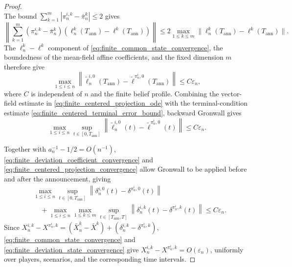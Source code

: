 \documentclass[12pt]{article}
\numberwithin{equation}{section}
\theoremstyle{definition}
\begin{document}
\begin{proof}
\begin{equation}
\end{equation}
The bound
\(\sum_{k=1}^m|\pi_n^{i,k}-\bar\pi_n^k|\leq2\) gives
\[
\left\|
\sum_{k=1}^m
(\pi_n^{i,k}-\bar\pi_n^k)
(\ell_n^k(T_{\mathrm{ann}})-\ell^k(T_{\mathrm{ann}}))
\right\|
\leq
2\max_{1\leq k\leq m}
\|\ell_n^k(T_{\mathrm{ann}})-\ell^k(T_{\mathrm{ann}})\|.
\]
The \(\ell_n^k-\ell^k\) component of
\eqref{eq:finite_common_state_convergence}, the boundedness of the
mean-field affine coefficients, and the fixed dimension \(m\) therefore
give
\begin{equation}\label{eq:finite_centered_terminal_error_bound}
\max_{1\leq i\leq n}
\left\|
\widetilde\ell_n^{i,0}(T_{\mathrm{ann}})
-\widetilde\ell^{\pi_n^i,0}(T_{\mathrm{ann}})
\right\|
\leq
C\varepsilon_n,
\end{equation}
where \(C\) is independent of \(n\) and the finite belief profile.
Combining the vector-field estimate in
\eqref{eq:finite_centered_projection_ode} with the terminal-condition
estimate \eqref{eq:finite_centered_terminal_error_bound}, backward Gronwall
gives
\begin{equation}\label{eq:finite_centered_projection_convergence}
\max_{1\le i\le n}
\sup_{t\in[0,T_{\mathrm{ann}}]}
\left\|
\widetilde\ell_n^{i,0}(t)-\widetilde\ell^{\pi_n^i,0}(t)
\right\|
\leq
C\varepsilon_n.
\end{equation}

Together with \(a_n^{-1}-1/2=O(n^{-1})\),
\eqref{eq:finite_deviation_coefficient_convergence} and
\eqref{eq:finite_centered_projection_convergence} allow Gronwall to be
applied before and after the announcement, giving
\begin{equation}\label{eq:finite_deviation_state_convergence}
\begin{aligned}
&\max_{1\le i\le n}
\sup_{t\in[0,T_{\mathrm{ann}}]}
\left\|
\delta_n^{i,0}(t)-\delta^{\pi_n^i,0}(t)
\right\|
\\
&\quad+
\max_{1\le i\le n}
\max_{1\le k\le m}
\sup_{t\in[T_{\mathrm{ann}},T]}
\left\|
\delta_n^{i,k}(t)-\delta^{\pi_n^i,k}(t)
\right\|
\leq
C\varepsilon_n.
\end{aligned}
\end{equation}
Since
\(X_n^{i,k}-X^{\pi_n^i,k}
=(\bar X_n^k-\bar X^k)
+(\delta_n^{i,k}-\delta^{\pi_n^i,k})\),
\eqref{eq:finite_common_state_convergence} and
\eqref{eq:finite_deviation_state_convergence} give
\(X_n^{i,k}-X^{\pi_n^i,k}=O(\varepsilon_n)\), uniformly over players,
scenarios, and the corresponding time intervals.


\end{proof}
\end{document}
